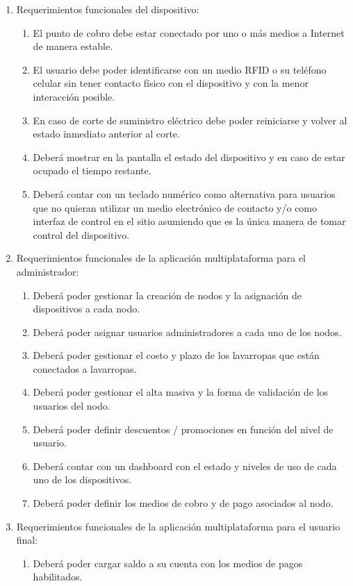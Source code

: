 \documentclass[11pt]{charter}
\begin{document}
\begin{enumerate}
\item Requerimientos funcionales del dispositivo:
	\begin{enumerate}
\item El punto de cobro debe estar conectado por uno o más medios a  Internet de manera estable.
\item El usuario debe poder identificarse  con un medio RFID o su teléfono celular sin tener contacto físico con el dispositivo y con la menor interacción posible.
\item En caso de corte de suministro eléctrico debe poder reiniciarse y volver al estado inmediato anterior al corte.
\item Deberá mostrar en la pantalla el estado del dispositivo y en caso de estar ocupado el tiempo restante.
\item Deberá contar con un teclado numérico como alternativa para usuarios que no quieran utilizar un medio electrónico de contacto y/o como interfaz de control en el sitio asumiendo que es la única manera de tomar control del dispositivo.
\end{enumerate}
\item Requerimientos funcionales de la aplicación multiplataforma para el administrador:
	\begin{enumerate} 
\item Deberá poder gestionar la creación de nodos y la asignación de dispositivos a cada nodo. 
\item Deberá poder asignar usuarios administradores a cada uno de los nodos.
\item Deberá poder gestionar el costo y plazo de los lavarropas que están conectados a lavarropas.
\item Deberá poder gestionar el alta masiva y la forma de validación de los usuarios del nodo.
\item Deberá poder definir descuentos / promociones en función del nivel de usuario.
\item Deberá contar con un dashboard con el estado y niveles de uso de cada uno de los dispositivos. 
\item Deberá poder definir los medios de cobro y de pago asociados al nodo. 
	\end{enumerate}
\item Requerimientos funcionales de la aplicación multiplataforma para el usuario final: 
\begin{enumerate} 
\item Deberá poder cargar saldo a su cuenta con los medios de pagos habilitados.

\end{enumerate}
\end{enumerate}
\end{document}
